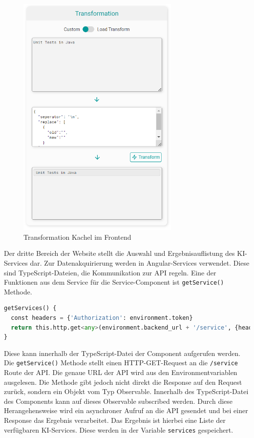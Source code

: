 \begin{figure}[H]
  \centering
    \includegraphics[width = 8cm]{bilder/websiteTransformation}
    \caption{Transformation Kachel im Frontend}
\end{figure}

Der dritte Bereich der Website stellt die Auswahl und Ergebnisauflistung des KI-Services dar. Zur Datenakquirierung werden in Angular-Services verwendet. Diese sind TypeScript-Dateien, die Kommunikation zur API regeln. Eine der Funktionen aus dem Service für die Service-Component ist \texttt{getService()} Methode. 

\begin{lstlisting}[language=Python, caption={Abfrage der Services}]
getServices() {
  const headers = {'Authorization': environment.token}
  return this.http.get<any>(environment.backend_url + '/service', {headers})
}
\end{lstlisting}

Diese kann innerhalb der TypeScript-Datei der Component aufgerufen werden. Die \texttt{getService()} Methode stellt einen HTTP-GET-Request an die \texttt{/service} Route der API. Die genaue URL der API wird aus den Environmentvariablen ausgelesen. Die Methode gibt jedoch nicht direkt die Response auf den Request zurück, sondern ein Objekt vom Typ Observable. Innerhalb des TypeScript-Datei des Components kann auf dieses Observable subscribed werden. Durch diese Herangehensweise wird ein asynchroner Aufruf an die API gesendet und bei einer Response das Ergebnis verarbeitet. Das Ergebnis ist hierbei eine Liste der verfügbaren KI-Services. Diese werden in der Variable \texttt{services} gespeichert.

